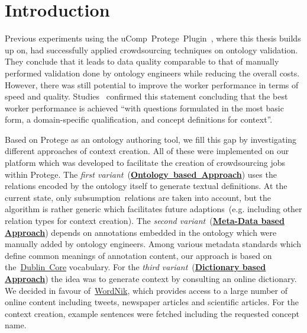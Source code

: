 \section{Introduction}\label{sec:approaches_introduction}
Previous experiments using the uComp~Protege~Plugin~\cite{wohlgenannt2016}, where this thesis builds up on, had successfully applied crowdsourcing techniques on ontology validation. They conclude that it leads to data quality comparable to that of manually performed validation done by ontology engineers while reducing the overall costs. However, there was still potential to improve the worker performance in terms of speed and quality. 
Studies~\cite{mortensen2013} confirmed this statement concluding that the best worker performance is achieved
\enquote{with questions formulated in the most basic form, a domain-specific qualification, and concept definitions for context}.

Based on Protege as an ontology authoring tool, we fill this gap by investigating different approaches of context creation. All of these were implemented on our platform which was developed to facilitate the creation of crowdsourcing jobs within Protege.
The \emph{first variant}~(\hyperref[sec:enrichment_ontology_approach]{\textbf{Ontology~based~Approach}}) uses the relations encoded by the ontology itself to generate textual definitions. At the current state, only subsumption~relations are taken into account, but the algorithm is rather generic which facilitates future adaptions~(e.g. including other relation types for context creation).
The \emph{second variant}~(\hyperref[sec:enrichment_metaData_approach]{\textbf{Meta-Data based Approach}}) depends on annotations embedded in the ontology which were manually added by ontology engineers. Among various metadata standards which define common meanings of annotation content, our approach is based on the~\hyperref[sec:dublin_core_metadata_vocabulary]{Dublin~Core} vocabulary.
For the \emph{third variant}~(\hyperref[sec:enrichment_dictionary_approach]{\textbf{Dictionary based Approach}}) the idea was to generate context by consulting an online dictionary. We decided in favour of~\hyperref[sec:wordnik]{WordNik}, which provides access to a large number of online content including tweets, newspaper articles and scientific articles. For the context creation, example sentences were fetched including the requested concept name. 